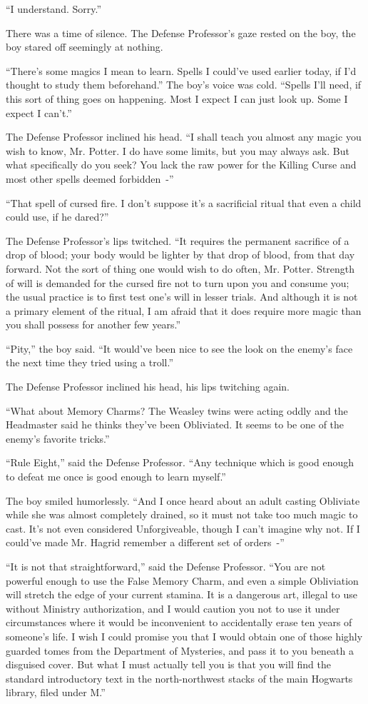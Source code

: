 ``I understand. Sorry.''

There was a time of silence. The Defense Professor's gaze rested on the boy, the boy stared off seemingly at nothing.

``There's some magics I mean to learn. Spells I could've used earlier today, if I'd thought to study them beforehand.'' The boy's voice was cold. ``Spells I'll need, if this sort of thing goes on happening. Most I expect I can just look up. Some I expect I can't.''

The Defense Professor inclined his head. ``I shall teach you almost any magic you wish to know, Mr. Potter. I do have some limits, but you may always ask. But what specifically do you seek? You lack the raw power for the Killing Curse and most other spells deemed forbidden~-''

``That spell of cursed fire. I don't suppose it's a sacrificial ritual that even a child could use, if he dared?''

The Defense Professor's lips twitched. ``It requires the permanent sacrifice of a drop of blood; your body would be lighter by that drop of blood, from that day forward. Not the sort of thing one would wish to do often, Mr. Potter. Strength of will is demanded for the cursed fire not to turn upon you and consume you; the usual practice is to first test one's will in lesser trials. And although it is not a primary element of the ritual, I am afraid that it does require more magic than you shall possess for another few years.''

``Pity,'' the boy said. ``It would've been nice to see the look on the enemy's face the next time they tried using a troll.''

The Defense Professor inclined his head, his lips twitching again.

``What about Memory Charms? The Weasley twins were acting oddly and the Headmaster said he thinks they've been Obliviated. It seems to be one of the enemy's favorite tricks.''

``Rule Eight,'' said the Defense Professor. ``Any technique which is good enough to defeat me once is good enough to learn myself.''

The boy smiled humorlessly. ``And I once heard about an adult casting Obliviate while she was almost completely drained, so it must not take too much magic to cast. It's not even considered Unforgiveable, though I can't imagine why not. If I could've made Mr. Hagrid remember a different set of orders~-''

``It is not that straightforward,'' said the Defense Professor. ``You are not powerful enough to use the False Memory Charm, and even a simple Obliviation will stretch the edge of your current stamina. It is a dangerous art, illegal to use without Ministry authorization, and I would caution you not to use it under circumstances where it would be inconvenient to accidentally erase ten years of someone's life. I wish I could promise you that I would obtain one of those highly guarded tomes from the Department of Mysteries, and pass it to you beneath a disguised cover. But what I must actually tell you is that you will find the standard introductory text in the north-northwest stacks of the main Hogwarts library, filed under M.''

